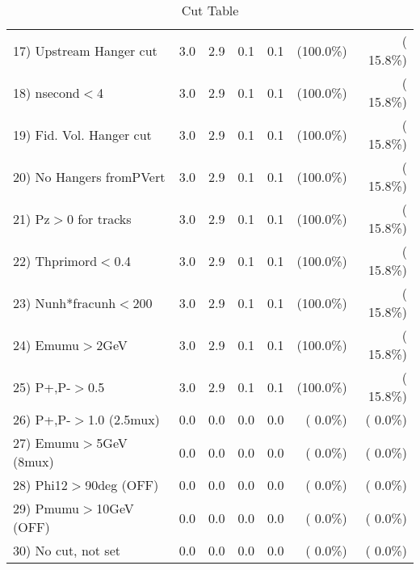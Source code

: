 \begin{table}[h!]
\begin{tabular}{||l||r|r|r|r|r|r||}
 17) Upstream Hanger cut  &          3.0 &          2.9 &          0.1 &          0.1 & (100.0\%) & ( 15.8\%) \\
 18) nsecond$<$4          &          3.0 &          2.9 &          0.1 &          0.1 & (100.0\%) & ( 15.8\%) \\
 19) Fid. Vol. Hanger cut &          3.0 &          2.9 &          0.1 &          0.1 & (100.0\%) & ( 15.8\%) \\
 20) No Hangers fromPVert &          3.0 &          2.9 &          0.1 &          0.1 & (100.0\%) & ( 15.8\%) \\
 21) Pz$>$0 for tracks    &          3.0 &          2.9 &          0.1 &          0.1 & (100.0\%) & ( 15.8\%) \\
 22) Thprimord$<$0.4      &          3.0 &          2.9 &          0.1 &          0.1 & (100.0\%) & ( 15.8\%) \\
 23) Nunh*fracunh$<$200   &          3.0 &          2.9 &          0.1 &          0.1 & (100.0\%) & ( 15.8\%) \\
 24) Emumu$>$2GeV         &          3.0 &          2.9 &          0.1 &          0.1 & (100.0\%) & ( 15.8\%) \\
 25) P+,P-$>$0.5          &          3.0 &          2.9 &          0.1 &          0.1 & (100.0\%) & ( 15.8\%) \\
 26) P+,P-$>$1.0 (2.5mux) &          0.0 &          0.0 &          0.0 &          0.0 & (  0.0\%) & (  0.0\%) \\
 27) Emumu$>$5GeV  (8mux) &          0.0 &          0.0 &          0.0 &          0.0 & (  0.0\%) & (  0.0\%) \\
 28) Phi12$>$90deg  (OFF) &          0.0 &          0.0 &          0.0 &          0.0 & (  0.0\%) & (  0.0\%) \\
 29) Pmumu$>$10GeV  (OFF) &          0.0 &          0.0 &          0.0 &          0.0 & (  0.0\%) & (  0.0\%) \\
 30) No cut, not set      &          0.0 &          0.0 &          0.0 &          0.0 & (  0.0\%) & (  0.0\%) \\
 \hline
 \hline
 \end{tabular}
 \caption{Cut Table           }
 \label{tab-cutheavy_neutrino_2.000}
 \end{table}
